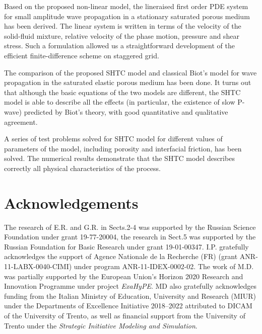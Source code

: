 \documentclass[3p,times,table]{article}
\begin{document}
Based on the proposed non-linear model, the lineraised first order PDE system 
for small amplitude wave propagation in a stationary saturated porous medium 
has been derived. The linear system is written in terms of the velocity of the 
solid-fluid mixture, relative velocity of the phase motion, pressure and shear 
stress. Such a formulation allowed us a straightforward development of the 
efficient finite-difference scheme on staggered grid.  

The comparison of the proposed SHTC model and classical Biot's model for wave 
propagation in the saturated elastic porous  medium has been done.
It turns out that although the basic equations of the two models are different, 
the SHTC model is able to describe all the effects (in particular, the 
existence of slow P-wave) predicted by Biot's theory, with good quantitative 
and qualitative agreement.

A series of test problems solved for SHTC model for different values of 
parameters of the model, including porosity and interfacial friction, has been 
solved. The numerical results demonstrate that the SHTC model describes 
correctly all physical characteristics of the process.   

\section*{Acknowledgements}
% 
The research of E.R. and G.R. in Sects.2-4 was supported by the Russian Science Foundation  under grant 19-77-20004, the research in Sect.5 was supported by the Russian Foundation for Basic Research under grant 19-01-00347.
I.P. gratefully acknowledges the support of Agence Nationale de la Recherche (FR) 
(grant ANR-11-LABX-0040-CIMI) under program ANR-11-IDEX-0002-02.
The work of M.D. was partially supported by the European Union's Horizon 2020 Research and Innovation  Programme under project \textit{ExaHyPE}. 
MD also gratefully acknowledges funding from the Italian Ministry of Education, University and Research (MIUR) under the Departments of Excellence Initiative 2018--2022 attributed to DICAM of the University of Trento, as well as financial support from the University of Trento under the  \textit{Strategic Initiative Modeling and Simulation}.



\printbibliography
\end{document}
